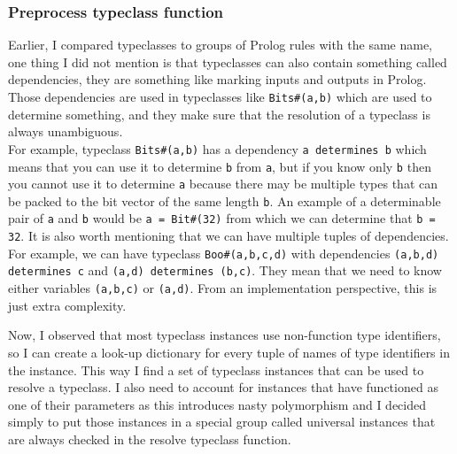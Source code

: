 \documentclass[12pt]{report}
\begin{document}
\subsubsection{Preprocess typeclass function}
Earlier, I compared typeclasses to groups of Prolog rules with the same name, one thing I did not mention is that typeclasses can also contain something called dependencies, they are something like marking inputs and outputs in Prolog. Those dependencies are used in typeclasses like \verb!Bits#(a,b)! which are used to determine something, and they make sure that the resolution of a typeclass is always unambiguous. \\ 
For example, typeclass \verb!Bits#(a,b)! has a dependency \verb!a determines b! which means that you can use it to determine \verb!b! from \verb!a!, but if you know only \verb!b! then you cannot use it to determine \verb!a! because there may be multiple types that can be packed to the bit vector of the same length \verb!b!. An example of a determinable pair of \verb!a! and \verb!b! would be  \verb!a = Bit#(32)! from which we can determine that \verb!b = 32!. It is also worth mentioning that we can have multiple tuples of dependencies. For example, we can have typeclass \verb!Boo#(a,b,c,d)! with dependencies \verb!(a,b,d) determines c! and \verb!(a,d) determines (b,c)!. They mean that we need to know either variables \verb!(a,b,c)! or \verb!(a,d)!. From an implementation perspective, this is just extra complexity.   
\par  
Now, I observed that most typeclass instances use non-function type identifiers, so I can create a look-up dictionary for every tuple of names of type identifiers in the instance. This way I find a set of typeclass instances that can be used to resolve a typeclass. I also need to account for instances that have functioned as one of their parameters as this introduces nasty polymorphism and I decided simply to put those instances in a special group called universal instances that are always checked in the resolve typeclass function.  
\end{document}
